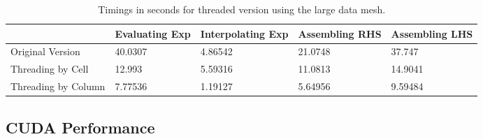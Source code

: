 \documentclass{article}
\begin{document}
\begin{table}[h]
\begin{tabularx}{1.2\textwidth}{ |X|X|X|X|X| }
\cline{2-5}
                                          & Evaluating Exp & Interpolating Exp & Assembling RHS & Assembling LHS \\ \hline
\multicolumn{1}{|l|}{Original Version}    & 40.0307        & 4.86542           & 21.0748        & 37.747         \\ \hline
\multicolumn{1}{|l|}{Threading by Cell}   & 12.993         & 5.59316           & 11.0813        & 14.9041        \\ \hline
\multicolumn{1}{|l|}{Threading by Column} & 7.77536        & 1.19127           & 5.64956        & 9.59484        \\ \hline
\end{tabularx}

\caption{Timings in seconds for threaded version using the large data mesh.}
\label{table:threads}
\end{table}
\subsection{CUDA Performance}
\end{document}
